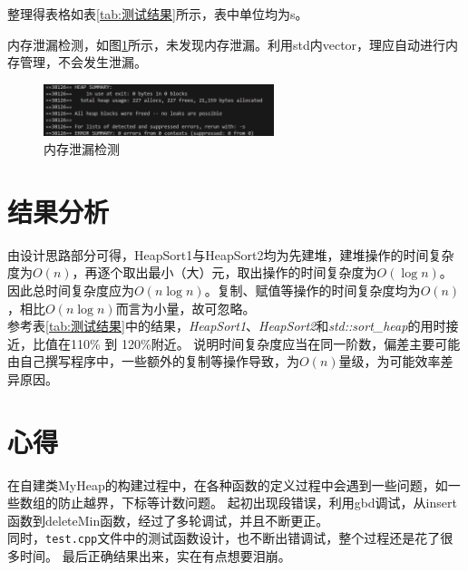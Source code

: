 \documentclass[UTF8]{ctexart}
\begin{document}
整理得表格如表\ref{tab:测试结果}所示，表中单位均为s。
\begin{table}[H]
    \centering
    \caption{效率对比}
    \label{tab:测试结果}
\end{table}

内存泄漏检测，如图\ref{fig:内存泄漏}所示，未发现内存泄漏。利用std内vector，理应自动进行内存管理，不会发生泄漏。
\begin{figure}[H]
    \centering
    \includegraphics[width=0.6\textwidth]{内存泄漏检查.png}
    \caption{内存泄漏检测}
    \label{fig:内存泄漏}
\end{figure}
\clearpage
\section{结果分析}
由设计思路部分可得，HeapSort1与HeapSort2均为先建堆，建堆操作的时间复杂度为$O(n)$，再逐个取出最小（大）元，取出操作的时间复杂度为$O(\log n)$。
因此总时间复杂度应为$O(n\log n)$。复制、赋值等操作的时间复杂度均为$O(n)$，相比$O(n\log n)$而言为小量，故可忽略。\\
参考表\ref{tab:测试结果}中的结果，\textit{HeapSort1}、\textit{HeapSort2}和\textit{std::sort\_heap}的用时接近，比值在110\% 到 120\%附近。
说明时间复杂度应当在同一阶数，偏差主要可能由自己撰写程序中，一些额外的复制等操作导致，为$O(n)$量级，为可能效率差异原因。\\

\section{心得}
在自建类MyHeap的构建过程中，在各种函数的定义过程中会遇到一些问题，如一些数组的防止越界，下标等计数问题。
起初出现段错误，利用gbd调试，从insert函数到deleteMin函数，经过了多轮调试，并且不断更正。\\
同时，\texttt{test.cpp}文件中的测试函数设计，也不断出错调试，整个过程还是花了很多时间。
最后正确结果出来，实在有点想要泪崩。\\
\end{document}

